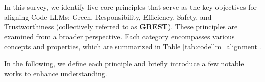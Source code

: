 
% 
In this survey, we identify five core principles that serve as the key objectives for aligning Code LLMs: Green, Responsibility, Efficiency, Safety, and Trustworthiness (collectively referred to as \textbf{GREST}). These principles are examined from a broader perspective. Each category encompasses various concepts and properties, which are summarized in Table \ref{tab:codellm_alignment}. 

In the following, we define each principle and briefly introduce a few notable works to enhance understanding.

